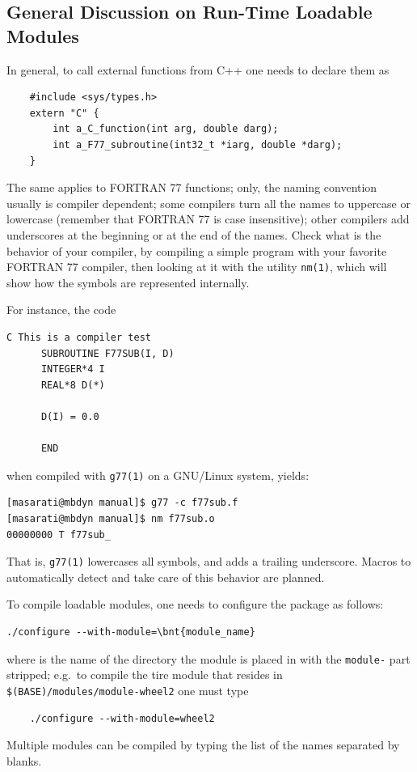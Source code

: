 \subsection{General Discussion on Run-Time Loadable Modules}
In general, to call external functions from C++ one needs
to declare them as
\begin{verbatim}
    #include <sys/types.h>
    extern "C" {
        int a_C_function(int arg, double darg);
        int a_F77_subroutine(int32_t *iarg, double *darg);
    }
\end{verbatim}
The same applies to FORTRAN 77 functions; only, the naming convention
usually is compiler dependent; some compilers turn all the names to 
uppercase or lowercase (remember that FORTRAN 77 is case insensitive);
other compilers add underscores at the beginning or at the end of the
names.
Check what is the behavior of your compiler, by compiling a simple 
program with your favorite FORTRAN 77 compiler, then looking at it
with the utility \texttt{nm(1)}, which will show how the symbols are represented 
internally.

\noindent
For instance, the code
\begin{verbatim}
C This is a compiler test
      SUBROUTINE F77SUB(I, D)
      INTEGER*4 I
      REAL*8 D(*)

      D(I) = 0.0

      END
\end{verbatim}
when compiled with \texttt{g77(1)} on a GNU/Linux system, yields:
\begin{verbatim}
[masarati@mbdyn manual]$ g77 -c f77sub.f
[masarati@mbdyn manual]$ nm f77sub.o
00000000 T f77sub_
\end{verbatim}
That is, \texttt{g77(1)} lowercases all symbols, and adds a trailing 
underscore.
Macros to automatically detect and take care of this behavior 
are planned.


\noindent
To compile loadable modules, one needs to configure
the package as follows:
\begin{Verbatim}[commandchars=\\\{\}]
    ./configure --with-module=\bnt{module_name}
\end{Verbatim}
where  is the name of the directory the module
is placed in with the \texttt{module-} part stripped; e.g.\ to compile
the tire module that resides in \texttt{\$(BASE)/modules/module-wheel2} 
one must type
\begin{verbatim}
    ./configure --with-module=wheel2
\end{verbatim}
Multiple modules can be compiled by typing the list of the names
separated by blanks.

